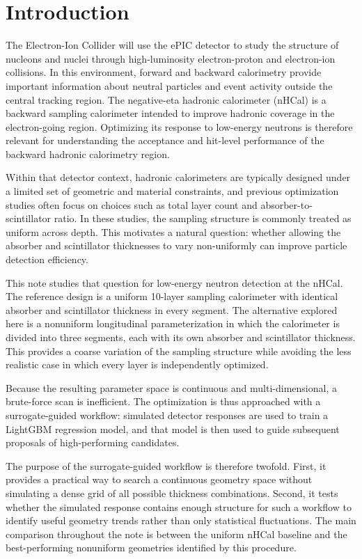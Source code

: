 \section{Introduction}\label{sec:introduction}

\noindent The Electron-Ion Collider will use the ePIC detector to study the structure of nucleons and nuclei through high-luminosity electron-proton and electron-ion collisions. In this environment, forward and backward calorimetry provide important information about neutral particles and event activity outside the central tracking region. The negative-eta hadronic calorimeter (nHCal) is a backward sampling calorimeter intended to improve hadronic coverage in the electron-going region. Optimizing its response to low-energy neutrons is therefore relevant for understanding the acceptance and hit-level performance of the backward hadronic calorimetry region.

\noindent Within that detector context, hadronic calorimeters are typically designed under a limited set of geometric and material constraints, and previous optimization studies often 
focus on choices such as total layer count and absorber-to-scintillator ratio. In these studies, the sampling structure is commonly treated as uniform across depth. This motivates a 
natural question: whether allowing the absorber and scintillator thicknesses to vary non-uniformly can improve particle detection efficiency.

\noindent This note studies that question for low-energy neutron detection at the nHCal. The reference design is a uniform 10-layer 
sampling calorimeter with identical absorber and scintillator thickness in every segment. The alternative explored here is a nonuniform longitudinal parameterization in 
which the calorimeter is divided into three segments, each with its own absorber and scintillator thickness. This provides a coarse variation of the sampling structure while 
avoiding the less realistic case in which every layer is independently optimized.

\noindent Because the resulting parameter space is continuous and multi-dimensional, a brute-force scan is inefficient. The optimization is thus approached with a
surrogate-guided workflow: simulated detector responses are used to train a LightGBM regression model, and that model is then used to guide subsequent proposals of high-performing candidates.

\noindent The purpose of the surrogate-guided workflow is therefore twofold. First, it provides a practical way to search a continuous geometry space without simulating a dense grid of all possible thickness combinations. Second, it tests whether the simulated response contains enough structure for such a workflow to identify useful geometry trends rather than only statistical fluctuations. The main comparison throughout the note is between the uniform nHCal baseline and the best-performing nonuniform geometries identified by this procedure.
